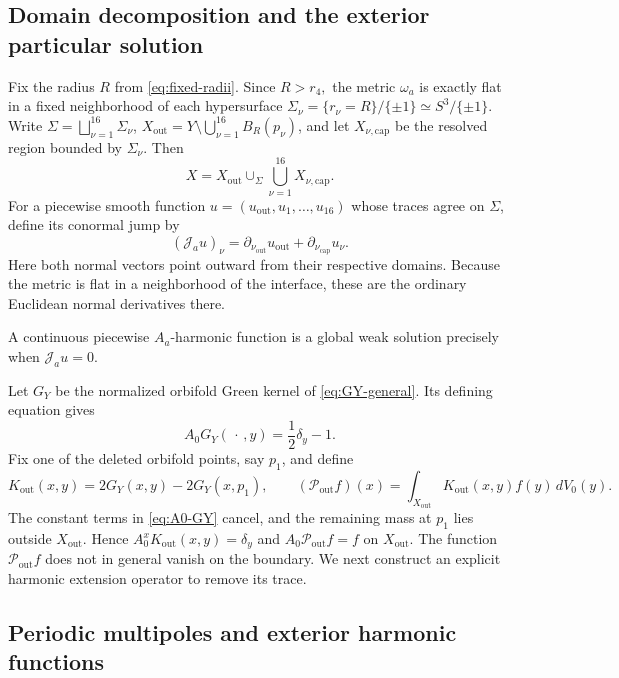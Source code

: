 \documentclass[11pt,a4paper,twoside]{article}
\numberwithin{equation}{section}
\theoremstyle{definition}
\theoremstyle{remark}
\begin{document}
\subsection{Domain decomposition and the exterior particular solution}
\label{subsec:domain-decomposition}

Fix the radius \(R\) from
\eqref{eq:fixed-radii}.  Since \(R>r_4,\) the metric \(\omega_a\) is exactly flat in a fixed neighborhood of
each hypersurface \(\Sigma_\nu=\{r_\nu=R\}/\{\pm1\}\simeq S^3/\{\pm1\}\).
Write \(\Sigma=\bigsqcup_{\nu=1}^{16}\Sigma_\nu\),
\(X_{\mathrm{out}}=Y\setminus\bigcup_{\nu=1}^{16}B_R(p_\nu)\),
and let \(X_{\nu,\mathrm{cap}}\) be the resolved region bounded by
\(\Sigma_\nu\). Then
\begin{equation}\label{eq:X-domain-decomposition}
X
=
X_{\mathrm{out}}
\cup_{\Sigma}
\bigcup_{\nu=1}^{16}
X_{\nu,\mathrm{cap}}.
\end{equation}
For a piecewise smooth function \(u = \left( u_{\mathrm{out}}, u_1,\ldots,u_{16} \right)\) whose traces agree on \(\Sigma\), define its conormal jump by
\[
(\mathcal J_a u)_\nu
=
\partial_{\nu_{\mathrm{out}}}
u_{\mathrm{out}}
+
\partial_{\nu_{\mathrm{cap}}}
u_\nu.
\]
Here both normal vectors point outward from their respective domains.
Because the metric is flat in a neighborhood of the interface, these
are the ordinary Euclidean normal derivatives there.

A continuous piecewise \(A_a\)-harmonic function is a global weak
solution precisely when \(\mathcal J_au=0\).

Let \(G_Y\) be the normalized orbifold Green kernel of
\eqref{eq:GY-general}. Its defining equation gives
\begin{equation}\label{eq:A0-GY}
A_0G_Y(\,\cdot\,,y)
=
\frac12\delta_y-1.
\end{equation}
Fix one of the deleted orbifold points, say \(p_1\), and define
\[
K_{\mathrm{out}}(x,y)=2G_Y(x,y)-2G_Y(x,p_1),\qquad
(\mathcal P_{\mathrm{out}}f)(x)=
\int_{X_{\mathrm{out}}}K_{\mathrm{out}}(x,y)f(y)\,dV_0(y).
\]
The constant terms in \eqref{eq:A0-GY} cancel, and the remaining
mass at \(p_1\) lies outside \(X_{\mathrm{out}}\). Hence
\(A_0^xK_{\mathrm{out}}(x,y)=\delta_y\) and
\(A_0\mathcal P_{\mathrm{out}}f=f\) on \(X_{\mathrm{out}}\).
The function \(\mathcal P_{\mathrm{out}}f\) does not in general
vanish on the boundary.  We next construct an explicit harmonic
extension operator to remove its trace.

\subsection{Periodic multipoles and exterior harmonic functions}
\label{subsec:outer-harmonic}
\end{document}
